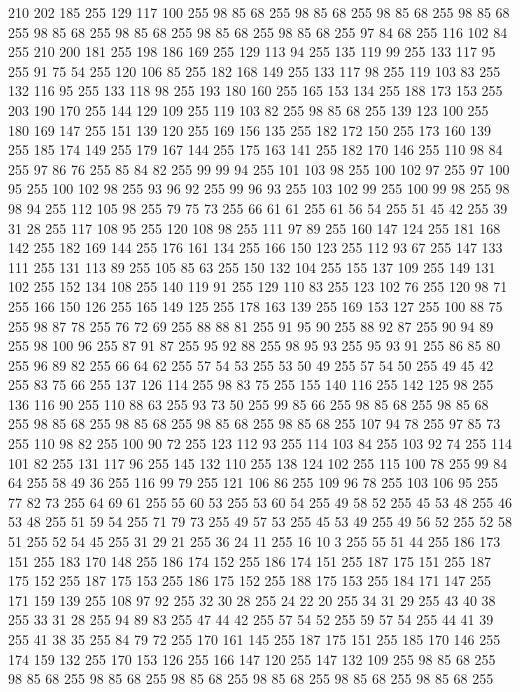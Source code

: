 210 202 185 255 129 117 100 255 98 85 68 255 98 85 68 255 98 85 68 255 98 85 68 255 98 85 68 255 98 85 68 255 98 85 68 255 98 85 68 255 97 84 68 255 116 102 84 255 210 200 181 255 198 186 169 255 129 113 94 255 135 119 99 255 133 117 95 255 91 75 54 255 120 106 85 255 182 168 149 255 133 117 98 255 119 103 83 255 132 116 95 255 133 118 98 255 193 180 160 255 165 153 134 255 188 173 153 255 203 190 170 255 144 129 109 255 119 103 82 255 98 85 68 255 139 123 100 255 180 169 147 255 151 139 120 255 169 156 135 255 182 172 150 255 173 160 139 255 185 174 149 255 179 167 144 255 175 163 141 255 182 170 146 255 110 98 84 255 97 86 76 255 85 84 82 255 99 99 94 255 101 103 98 255 100 102 97 255 97 100 95 255 100 102 98 255 93 96 92 255 99 96 93 255 103 102 99 255 100 99 98 255 98 98 94 255 112 105 98 255 79 75 73 255 66 61 61 255 61 56 54 255 51 45 42 255 39 31 28 255 117 108 95 255 120 108 98 255 111 97 89 255 160 147 124 255
181 168 142 255 182 169 144 255 176 161 134 255 166 150 123 255 112 93 67 255 147 133 111 255 131 113 89 255 105 85 63 255 150 132 104 255 155 137 109 255 149 131 102 255 152 134 108 255 140 119 91 255 129 110 83 255 123 102 76 255 120 98 71 255 166 150 126 255 165 149 125 255 178 163 139 255 169 153 127 255 100 88 75 255 98 87 78 255 76 72 69 255 88 88 81 255 91 95 90 255 88 92 87 255 90 94 89 255 98 100 96 255 87 91 87 255 95 92 88 255 98 95 93 255 95 93 91 255 86 85 80 255 96 89 82 255 66 64 62 255 57 54 53 255 53 50 49 255 57 54 50 255 49 45 42 255 83 75 66 255 137 126 114 255 98 83 75 255 155 140 116 255 142 125 98 255 136 116 90 255 110 88 63 255 93 73 50 255 99 85 66 255 98 85 68 255 98 85 68 255 98 85 68 255 98 85 68 255 98 85 68 255 98 85 68 255 107 94 78 255 97 85 73 255 110 98 82 255 100 90 72 255 123 112 93 255 114 103 84 255 103 92 74 255 114 101 82 255 131 117 96 255 145 132 110 255
138 124 102 255 115 100 78 255 99 84 64 255 58 49 36 255 116 99 79 255 121 106 86 255 109 96 78 255 103 106 95 255 77 82 73 255 64 69 61 255 55 60 53 255 53 60 54 255 49 58 52 255 45 53 48 255 46 53 48 255 51 59 54 255 71 79 73 255 49 57 53 255 45 53 49 255 49 56 52 255 52 58 51 255 52 54 45 255 31 29 21 255 36 24 11 255 16 10 3 255 55 51 44 255 186 173 151 255 183 170 148 255 186 174 152 255 186 174 151 255 187 175 151 255 187 175 152 255 187 175 153 255 186 175 152 255 188 175 153 255 184 171 147 255 171 159 139 255 108 97 92 255 32 30 28 255 24 22 20 255 34 31 29 255 43 40 38 255 33 31 28 255 94 89 83 255 47 44 42 255 57 54 52 255 59 57 54 255 44 41 39 255 41 38 35 255 84 79 72 255 170 161 145 255 187 175 151 255 185 170 146 255 174 159 132 255 170 153 126 255 166 147 120 255 147 132 109 255 98 85 68 255 98 85 68 255 98 85 68 255 98 85 68 255 98 85 68 255 98 85 68 255 98 85 68 255
